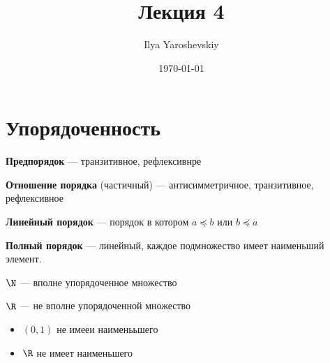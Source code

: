 \documentclass[english]{article}
\author{Ilya Yaroshevskiy}
\date{\today}
\title{Лекция 4}
\begin{document}
\maketitle
\tableofcontents

\renewcommand{\P}{\mathcal{P}}
\newcommand{\A}{\mathcal{A}}
\newcommand{\L}{\mathcal{L}}
\newcommand{\B}{\mathcal{B}}

\section{Упорядоченность}
\label{sec:org9cf4f37}
\begin{definition}
	\textbf{Предпорядок} --- транзитивное, рефлексивнре
\end{definition}
\begin{definition}
	\textbf{Отношение порядка} (частичный) --- антисимметричное, транзитивное, рефлексивное
\end{definition}
\begin{definition}
	\textbf{Линейный порядок} --- порядок в котором \(a \preceq b\) или \(b \preceq a\)
\end{definition}
\begin{definition}
	\textbf{Полный порядок} --- линейный, каждое подмножество имеет наименьший элемент.
\end{definition}
\begin{examp}
	\(\N\) --- вполне упорядоченное множество
\end{examp}
\begin{examp}
	\(\R\) --- не вполне упорядоченной множество
	\begin{itemize}
		\item \((0, 1)\) не имееи наименььшего
		\item \(\R\) не имеет наименьшего
	\end{itemize}
\end{examp}
\end{document}
